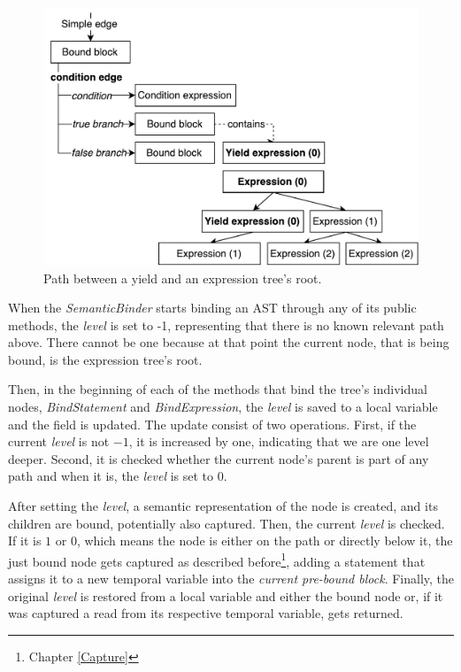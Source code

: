 \begin{figure}[H]
	\centering	
	\includegraphics[scale=0.75]{../img/5_3_path}	
	\caption{Path between a yield and an expression tree's root.}
	\label{fig5.3:Path}
\end{figure}

When the \emph{SemanticBinder} starts binding an AST through any of its public methods, the \emph{level} is set to -1, representing that there is no known relevant path above. There cannot be one because at that point the current node, that is being bound, is the expression tree’s root. 

Then, in the beginning of each of the methods that bind the tree’s individual nodes, \emph{BindStatement} and \emph{BindExpression}, the \emph{level} is saved to a local variable and the field is updated. The update consist of two operations. First, if the current \emph{level} is not $-1$, it is increased by one, indicating that we are one level deeper. Second, it is checked whether the current node’s parent is part of any path and when it is, the \emph{level} is set to $0$. 

After setting the \emph{level}, a semantic representation of the node is created, and its children are bound, potentially also captured. Then, the current \emph{level} is checked. If it is $1$ or $0$, which means the node is either on the path or directly below it, the just bound node gets captured as described before\footnote{Chapter \ref{Capture}}, adding a statement that assigns it to a new temporal variable into the \emph{current pre-bound block}. Finally, the original \emph{level} is restored from a local variable and either the bound node or, if it was captured a read from its respective temporal variable, gets returned.

